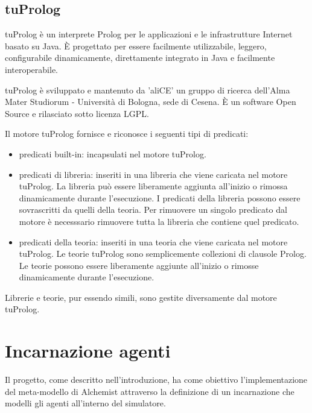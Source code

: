 \documentclass[12pt,a4paper,openright,twoside]{report}
\begin{document}
\section{tuProlog}
tuProlog \`e un interprete Prolog per le applicazioni e le infrastrutture Internet basato su Java. \`E progettato per essere facilmente utilizzabile, leggero, configurabile dinamicamente, direttamente integrato in Java e facilmente interoperabile.

tuProlog \`e sviluppato e mantenuto da 'aliCE' un gruppo di ricerca dell'Alma Mater Studiorum - Universit\`a di Bologna, sede di Cesena. \`E un software Open Source e rilasciato sotto licenza LGPL.

Il motore tuProlog fornisce e riconosce i seguenti tipi di predicati:
\begin{itemize}
  \item predicati built-in: incapsulati nel motore tuProlog.
  \item predicati di libreria: inseriti in una libreria che viene caricata nel motore tuProlog. La libreria pu\`o essere liberamente aggiunta all'inizio o rimossa dinamicamente durante l'esecuzione. I predicati della libreria possono essere sovrascritti da quelli della teoria. Per rimuovere un singolo predicato dal motore \`e necesssario rimuovere tutta la libreria che contiene quel predicato.
  \item predicati della teoria: inseriti in una teoria che viene caricata nel motore tuProlog. Le teorie tuProlog sono semplicemente collezioni di clausole Prolog. Le teorie possono essere liberamente aggiunte all'inizio o rimosse dinamicamente durante l'esecuzione.
\end{itemize}

Librerie e teorie, pur essendo simili, sono gestite diversamente dal motore tuProlog.


\chapter{Incarnazione agenti}
\lhead[\fancyplain{}{\bfseries\thepage}]{\fancyplain{}{\bfseries\rightmark}}

Il progetto, come descritto nell'introduzione, ha come obiettivo l'implementazione del meta-modello di Alchemist attraverso la definizione di un incarnazione che modelli gli agenti all'interno del simulatore.
\end{document}
